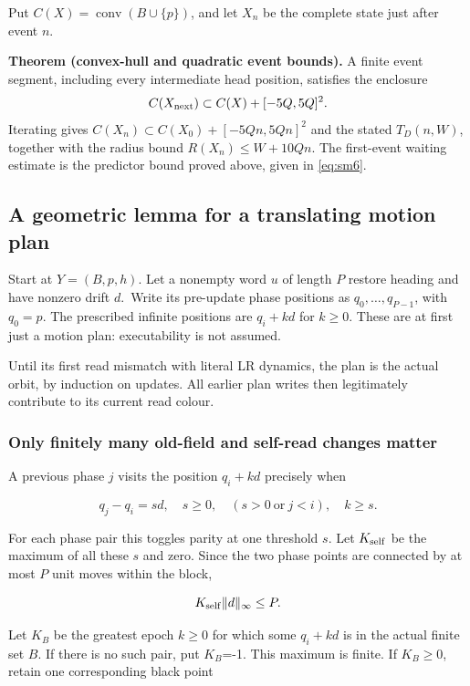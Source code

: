 \documentclass[
  11pt,
]{article}
\begin{document}
Put $C(X)=\operatorname{conv}(B\cup\{p\})$, and let $X_n$ be the
complete state just after event $n$.

\textbf{Theorem (convex-hull and quadratic event bounds).}
A finite event segment, including every intermediate head position, satisfies
the enclosure
\[C(X_{\rm next})\subset C(X)+[-5Q,5Q]^2.\] Iterating gives \(C(X_n)\subset C(X_0)+[-5Qn,5Qn]^2\) and
the stated \(T_D(n,W)\), together with the radius bound
\(R(X_n)\le W+10Qn\). The
first-event waiting estimate is the predictor bound proved above,
given in \eqref{eq:sm6}.

\subsection{A geometric lemma for a translating motion plan}\label{geo-3}

Start at \(Y=(B,p,h)\). Let a nonempty word \(u\) of length \(P\) restore heading
and have nonzero drift \(d\).~Write its pre-update phase positions as
$q_0,\ldots,q_{P-1}$, with $q_0=p$. The prescribed infinite positions are
$q_i+kd$ for $k\ge0$. These are at first just a motion plan:
executability is not assumed.

Until its first read mismatch with literal LR dynamics, the plan is the
actual orbit, by induction on updates. All earlier plan writes then
legitimately contribute to its current read colour.

\subsubsection{Only finitely many old-field and self-read changes
matter}\label{only-finitely-many-old-field-and-self-read-changes-matter}

A previous phase \(j\) visits the position $q_i+kd$ precisely when

\[
q_j-q_i=sd,\quad s\ge0,\quad(s>0\ \text{or}\ j<i),\quad k\ge s.
\]

For each phase pair this toggles parity at one threshold \(s\). Let $K_{\rm self}$
be the maximum of all these \(s\) and zero. Since the two phase points are
connected by at most \(P\) unit moves within the block,

\begin{equation}\label{eq:geo3}
K_{\rm self}\|d\|_\infty\le P.
\end{equation}

Let $K_B$ be the greatest epoch $k\ge0$ for which some $q_i+kd$
is in the actual finite set \(B\). If there is no such pair, put $K_B$=-1.
This maximum is finite. If $K_B\ge0$, retain one corresponding
black point
\end{document}
